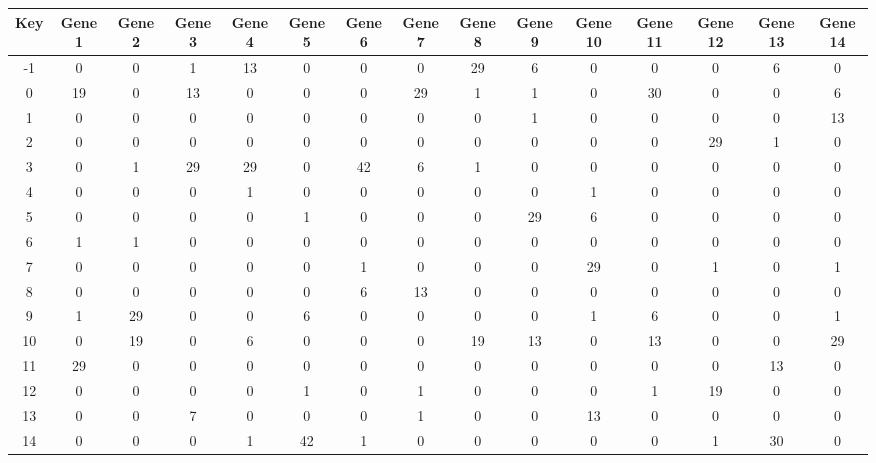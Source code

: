 \begin{tabular}{|c|c|c|c|c|c|c|c|c|c|c|c|c|c|c|}
\hline
Key & Gene 1 & Gene 2 & Gene 3 & Gene 4 & Gene 5 & Gene 6 & Gene 7 & Gene 8 & Gene 9 & Gene 10 & Gene 11 & Gene 12 & Gene 13 & Gene 14 \\
\hline
-1 & 0 & 0 & 1 & 13 & 0 & 0 & 0 & 29 & 6 & 0 & 0 & 0 & 6 & 0 \\
0 & 19 & 0 & 13 & 0 & 0 & 0 & 29 & 1 & 1 & 0 & 30 & 0 & 0 & 6 \\
1 & 0 & 0 & 0 & 0 & 0 & 0 & 0 & 0 & 1 & 0 & 0 & 0 & 0 & 13 \\
2 & 0 & 0 & 0 & 0 & 0 & 0 & 0 & 0 & 0 & 0 & 0 & 29 & 1 & 0 \\
3 & 0 & 1 & 29 & 29 & 0 & 42 & 6 & 1 & 0 & 0 & 0 & 0 & 0 & 0 \\
4 & 0 & 0 & 0 & 1 & 0 & 0 & 0 & 0 & 0 & 1 & 0 & 0 & 0 & 0 \\
5 & 0 & 0 & 0 & 0 & 1 & 0 & 0 & 0 & 29 & 6 & 0 & 0 & 0 & 0 \\
6 & 1 & 1 & 0 & 0 & 0 & 0 & 0 & 0 & 0 & 0 & 0 & 0 & 0 & 0 \\
7 & 0 & 0 & 0 & 0 & 0 & 1 & 0 & 0 & 0 & 29 & 0 & 1 & 0 & 1 \\
8 & 0 & 0 & 0 & 0 & 0 & 6 & 13 & 0 & 0 & 0 & 0 & 0 & 0 & 0 \\
9 & 1 & 29 & 0 & 0 & 6 & 0 & 0 & 0 & 0 & 1 & 6 & 0 & 0 & 1 \\
10 & 0 & 19 & 0 & 6 & 0 & 0 & 0 & 19 & 13 & 0 & 13 & 0 & 0 & 29 \\
11 & 29 & 0 & 0 & 0 & 0 & 0 & 0 & 0 & 0 & 0 & 0 & 0 & 13 & 0 \\
12 & 0 & 0 & 0 & 0 & 1 & 0 & 1 & 0 & 0 & 0 & 1 & 19 & 0 & 0 \\
13 & 0 & 0 & 7 & 0 & 0 & 0 & 1 & 0 & 0 & 13 & 0 & 0 & 0 & 0 \\
14 & 0 & 0 & 0 & 1 & 42 & 1 & 0 & 0 & 0 & 0 & 0 & 1 & 30 & 0 \\
\hline
\end{tabular}